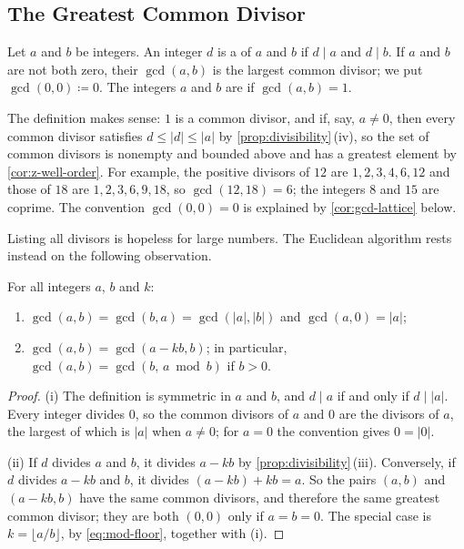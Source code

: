 \subsection{The Greatest Common Divisor}

\begin{definition}
\label{def:gcd}
Let $a$ and $b$ be integers. An integer $d$ is a  of $a$ and $b$ if $d\mid a$ and $d\mid b$. If $a$ and $b$ are not both zero, their  $\gcd(a,b)$ is the largest common divisor; we put $\gcd(0,0)\coloneqq0$. The integers $a$ and $b$ are  if $\gcd(a,b)=1$.
\end{definition}

The definition makes sense: $1$ is a common divisor, and if, say, $a\ne0$, then every common divisor satisfies $d\le|d|\le|a|$ by \cref{prop:divisibility}\,(iv), so the set of common divisors is nonempty and bounded above and has a greatest element by \cref{cor:z-well-order}. For example, the positive divisors of $12$ are $1,2,3,4,6,12$ and those of $18$ are $1,2,3,6,9,18$, so $\gcd(12,18)=6$; the integers $8$ and $15$ are coprime. The convention $\gcd(0,0)=0$ is explained by \cref{cor:gcd-lattice} below.

Listing all divisors is hopeless for large numbers. The Euclidean algorithm rests instead on the following observation.

\begin{lemma}
\label{lem:gcd-basic}
For all integers $a$, $b$ and $k$:
\begin{enumerate}
\item $\gcd(a,b)=\gcd(b,a)=\gcd(|a|,|b|)$ and $\gcd(a,0)=|a|$;
\item $\gcd(a,b)=\gcd(a-kb,b)$; in particular, $\gcd(a,b)=\gcd(b,\,a\bmod b)$ if $b>0$.
\end{enumerate}
\end{lemma}

\begin{proof}
(i) The definition is symmetric in $a$ and $b$, and $d\mid a$ if and only if $d\mid|a|$. Every integer divides $0$, so the common divisors of $a$ and $0$ are the divisors of $a$, the largest of which is $|a|$ when $a\ne0$; for $a=0$ the convention gives $0=|0|$.

(ii) If $d$ divides $a$ and $b$, it divides $a-kb$ by \cref{prop:divisibility}\,(iii). Conversely, if $d$ divides $a-kb$ and $b$, it divides $(a-kb)+kb=a$. So the pairs $(a,b)$ and $(a-kb,b)$ have the same common divisors, and therefore the same greatest common divisor; they are both $(0,0)$ only if $a=b=0$. The special case is $k=\lfloor a/b\rfloor$, by \eqref{eq:mod-floor}, together with (i).
\end{proof}

